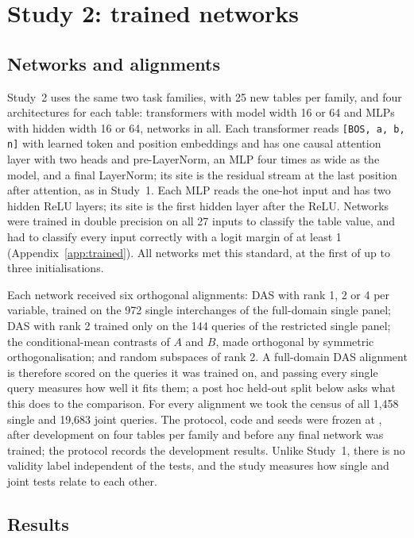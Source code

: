 \section{Study 2: trained networks}\label{sec:trained}

\subsection{Networks and alignments}

Study~2 uses the same two task families, with 25 new tables per family, and four architectures for each table:
transformers with model width 16 or 64 and MLPs with hidden width 16 or 64, \TrnNetworks{} networks in all. Each
transformer reads \texttt{[BOS, a, b, n]} with learned token and position embeddings and has one causal attention
layer with two heads and pre-LayerNorm, an MLP four times as wide as the model, and a final LayerNorm; its site is
the residual stream at the last position after attention, as in Study~1. Each MLP reads the one-hot input and has
two hidden ReLU layers; its site is the first hidden layer after the ReLU. Networks were trained in double precision
on all 27 inputs to classify the table value, and had to classify every input correctly with a logit margin of at
least 1 (Appendix~\ref{app:trained}). All \TrnCompetent{} networks met this standard, \TrnFirstAttempt{} at the first
of up to three initialisations.

Each network received six orthogonal alignments: DAS with rank 1, 2 or 4 per variable, trained on the 972 single
interchanges of the full-domain single panel; DAS with rank 2 trained only on the 144 queries of the restricted
single panel; the conditional-mean contrasts of $A$ and $B$, made orthogonal by symmetric orthogonalisation; and
random subspaces of rank 2. A full-domain DAS alignment is therefore scored on the queries it was trained on, and
passing every single query measures how well it fits them; a post hoc held-out split below asks what this does to
the comparison. For every alignment we took the census of all 1,458
single and 19,683 joint queries. The protocol, code and seeds were frozen at \TrnFreezeTime, after development on
four tables per family and before any final network was trained; the protocol records the development results.
Unlike Study~1, there is no validity label independent of the tests, and the study measures how single and joint
tests relate to each other.

\subsection{Results}

